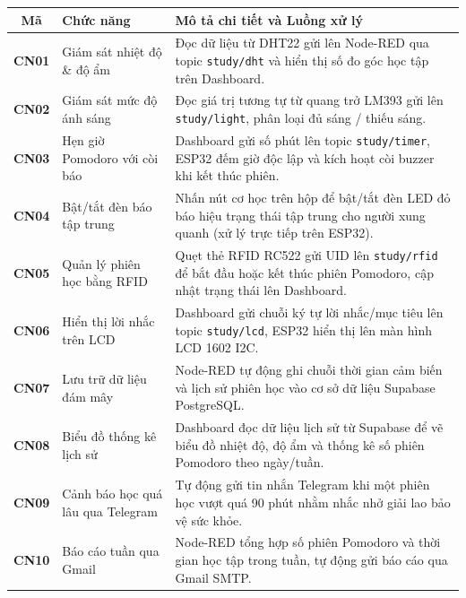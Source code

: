 \begin{longtable}{|c|p{4.5cm}|p{8.5cm}|}
\hline
\textbf{Mã} & \textbf{Chức năng} & \textbf{Mô tả chi tiết và Luồng xử lý} \\ \hline
\endhead

\textbf{CN01} & Giám sát nhiệt độ \& độ ẩm & Đọc dữ liệu từ DHT22 gửi lên Node-RED qua topic \texttt{study/dht} và hiển thị số đo góc học tập trên Dashboard. \\ \hline

\textbf{CN02} & Giám sát mức độ ánh sáng & Đọc giá trị tương tự từ quang trở LM393 gửi lên \texttt{study/light}, phân loại đủ sáng / thiếu sáng. \\ \hline

\textbf{CN03} & Hẹn giờ Pomodoro với còi báo & Dashboard gửi số phút lên topic \texttt{study/timer}, ESP32 đếm giờ độc lập và kích hoạt còi buzzer khi kết thúc phiên. \\ \hline

\textbf{CN04} & Bật/tắt đèn báo tập trung & Nhấn nút cơ học trên hộp để bật/tắt đèn LED đỏ báo hiệu trạng thái tập trung cho người xung quanh (xử lý trực tiếp trên ESP32). \\ \hline

\textbf{CN05} & Quản lý phiên học bằng RFID & Quẹt thẻ RFID RC522 gửi UID lên \texttt{study/rfid} để bắt đầu hoặc kết thúc phiên Pomodoro, cập nhật trạng thái lên Dashboard. \\ \hline

\textbf{CN06} & Hiển thị lời nhắc trên LCD & Dashboard gửi chuỗi ký tự lời nhắc/mục tiêu lên topic \texttt{study/lcd}, ESP32 hiển thị lên màn hình LCD 1602 I2C. \\ \hline

\textbf{CN07} & Lưu trữ dữ liệu đám mây & Node-RED tự động ghi chuỗi thời gian cảm biến và lịch sử phiên học vào cơ sở dữ liệu Supabase PostgreSQL. \\ \hline

\textbf{CN08} & Biểu đồ thống kê lịch sử & Dashboard đọc dữ liệu lịch sử từ Supabase để vẽ biểu đồ nhiệt độ, độ ẩm và thống kê số phiên Pomodoro theo ngày/tuần. \\ \hline

\textbf{CN09} & Cảnh báo học quá lâu qua Telegram & Tự động gửi tin nhắn Telegram khi một phiên học vượt quá 90 phút nhằm nhắc nhở giải lao bảo vệ sức khỏe. \\ \hline

\textbf{CN10} & Báo cáo tuần qua Gmail & Node-RED tổng hợp số phiên Pomodoro và thời gian học tập trong tuần, tự động gửi báo cáo qua Gmail SMTP. \\ \hline


\end{longtable}
